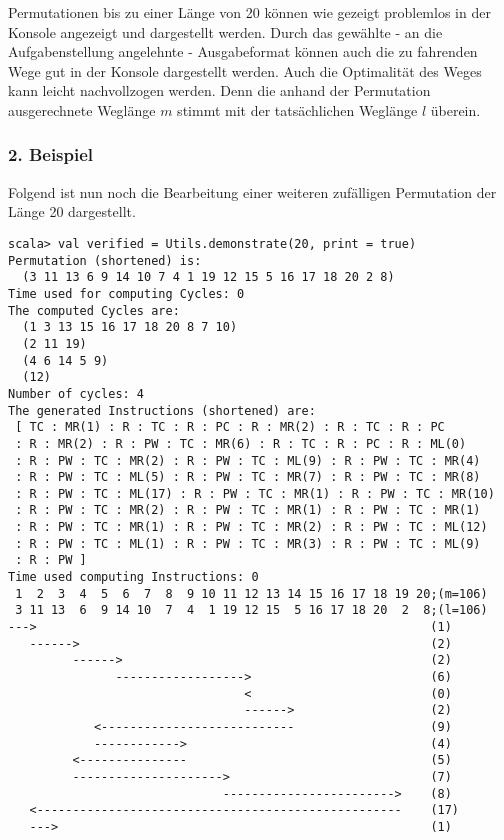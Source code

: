 Permutationen bis zu einer Länge von 20 können wie gezeigt problemlos in der Konsole angezeigt und dargestellt werden.
Durch das gewählte - an die Aufgabenstellung angelehnte - Ausgabeformat können auch die zu fahrenden Wege gut in der Konsole dargestellt werden.
Auch die Optimalität des Weges kann leicht nachvollzogen werden.
Denn die anhand der Permutation ausgerechnete Weglänge $m$ stimmt mit der tatsächlichen Weglänge $l$ überein.
\subsubsection*{2. Beispiel}
Folgend ist nun noch die Bearbeitung einer weiteren zufälligen Permutation der Länge 20 dargestellt.
\begin{lstlisting}
scala> val verified = Utils.demonstrate(20, print = true) 
Permutation (shortened) is:
  (3 11 13 6 9 14 10 7 4 1 19 12 15 5 16 17 18 20 2 8)
Time used for computing Cycles: 0
The computed Cycles are: 
  (1 3 13 15 16 17 18 20 8 7 10)
  (2 11 19)
  (4 6 14 5 9)
  (12)
Number of cycles: 4
The generated Instructions (shortened) are: 
 [ TC : MR(1) : R : TC : R : PC : R : MR(2) : R : TC : R : PC
 : R : MR(2) : R : PW : TC : MR(6) : R : TC : R : PC : R : ML(0)
 : R : PW : TC : MR(2) : R : PW : TC : ML(9) : R : PW : TC : MR(4)
 : R : PW : TC : ML(5) : R : PW : TC : MR(7) : R : PW : TC : MR(8)
 : R : PW : TC : ML(17) : R : PW : TC : MR(1) : R : PW : TC : MR(10)
 : R : PW : TC : MR(2) : R : PW : TC : MR(1) : R : PW : TC : MR(1)
 : R : PW : TC : MR(1) : R : PW : TC : MR(2) : R : PW : TC : ML(12)
 : R : PW : TC : ML(1) : R : PW : TC : MR(3) : R : PW : TC : ML(9)
 : R : PW ] 
Time used computing Instructions: 0
 1  2  3  4  5  6  7  8  9 10 11 12 13 14 15 16 17 18 19 20;(m=106)
 3 11 13  6  9 14 10  7  4  1 19 12 15  5 16 17 18 20  2  8;(l=106)
--->                                                       (1)
   ------>                                                 (2)
         ------>                                           (2)
               ------------------>                         (6)
                                 <                         (0)
                                 ------>                   (2)
            <---------------------------                   (9)
            ------------>                                  (4)
         <---------------                                  (5)
         --------------------->                            (7)
                              ------------------------>    (8)
   <---------------------------------------------------    (17)
   --->                                                    (1)

\end{lstlisting}
